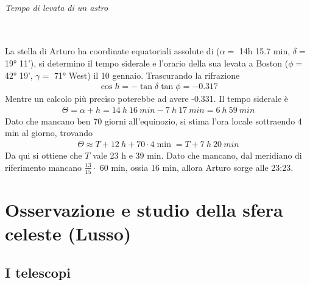\documentclass[a4paper, oneside]{book}
\begin{document}
\paragraph{Tempo di levata di un astro} \mbox{} \\ 
La stella di Arturo ha coordinate equatoriali assolute di ($\alpha =$ 14h 15.7 min, $\delta=$ 19° 11'), 
si determino il tempo siderale e l'orario della sua levata a Boston 
($\phi =$ 42° 19', $\gamma =$ 71° West) il 10 gennaio. Trascurando la rifrazione 
\begin{gather*}
    \cos h = -\tan\delta \tan\phi = -0.317
\end{gather*}
Mentre un calcolo più preciso poterebbe ad avere -0.331. Il tempo siderale è
\begin{gather*}
    \Theta = \alpha + h = 14 \ h \ 16 \ min - 7 \ h \ 17 \ min = 6 \ h \ 59 \ min 
\end{gather*}
Dato che mancano ben 70 giorni all'equinozio, si stima l'ora locale sottraendo 4 min al giorno,
trovando 
\begin{gather*}
    \Theta \approx T + 12 \ h + 70 \cdot 4 \min = T + 7 \ h \ 20 \ min
\end{gather*}
Da qui si ottiene che $T$ vale 23 h e 39 min. Dato che mancano, dal meridiano di riferimento
mancano $\frac{13}{15} \cdot$ 60 min, ossia 16 min, allora Arturo sorge alle 23:23. 


\part{Osservazione e studio della sfera celeste (Lusso)}
\chapter{I telescopi}
\end{document}
